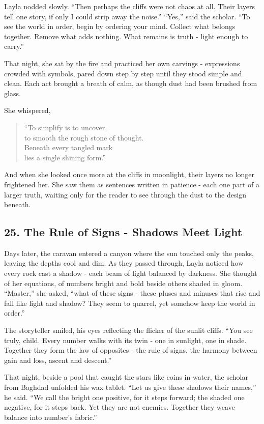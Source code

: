 \documentclass[
  letterpaper,
  DIV=11,
  numbers=noendperiod]{scrreprt}
\begin{document}
Layla nodded slowly. ``Then perhaps the cliffs were not chaos at all.
Their layers tell one story, if only I could strip away the noise.''
``Yes,'' said the scholar. ``To see the world in order, begin by
ordering your mind. Collect what belongs together. Remove what adds
nothing. What remains is truth - light enough to carry.''

That night, she sat by the fire and practiced her own carvings -
expressions crowded with symbols, pared down step by step until they
stood simple and clean. Each act brought a breath of calm, as though
dust had been brushed from glass.

She whispered,

\begin{quote}
``To simplify is to uncover,\\
to smooth the rough stone of thought.\\
Beneath every tangled mark\\
lies a single shining form.''
\end{quote}

And when she looked once more at the cliffs in moonlight, their layers
no longer frightened her. She saw them as sentences written in patience
- each one part of a larger truth, waiting only for the reader to see
through the dust to the design beneath.

\subsection{25. The Rule of Signs - Shadows Meet
Light}\label{the-rule-of-signs---shadows-meet-light}

Days later, the caravan entered a canyon where the sun touched only the
peaks, leaving the depths cool and dim. As they passed through, Layla
noticed how every rock cast a shadow - each beam of light balanced by
darkness. She thought of her equations, of numbers bright and bold
beside others shaded in gloom. ``Master,'' she asked, ``what of these
signs - these pluses and minuses that rise and fall like light and
shadow? They seem to quarrel, yet somehow keep the world in order.''

The storyteller smiled, his eyes reflecting the flicker of the sunlit
cliffs. ``You see truly, child. Every number walks with its twin - one
in sunlight, one in shade. Together they form the law of opposites - the
rule of signs, the harmony between gain and loss, ascent and descent.''

That night, beside a pool that caught the stars like coins in water, the
scholar from Baghdad unfolded his wax tablet. ``Let us give these
shadows their names,'' he said. ``We call the bright one positive, for
it steps forward; the shaded one negative, for it steps back. Yet they
are not enemies. Together they weave balance into number's fabric.''
\end{document}
